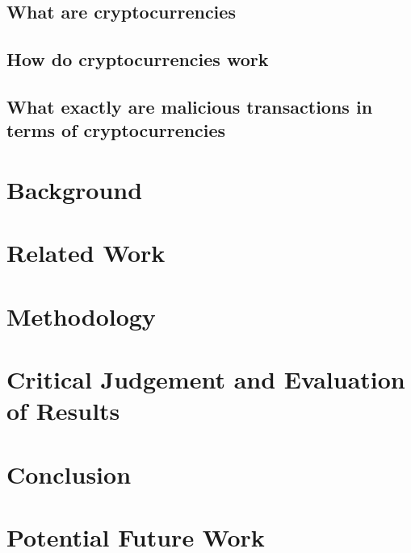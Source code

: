 \documentclass{article}
\begin{document}
\subsection{What are cryptocurrencies}
\subsection{How do cryptocurrencies work}
\subsection{What exactly are malicious transactions in terms of cryptocurrencies}
\pagebreak
\section{Background}
\pagebreak
\section{Related Work}
\pagebreak
\section{Methodology}
\pagebreak
\section{Critical Judgement and Evaluation of Results}
\pagebreak
\section{Conclusion}
\pagebreak
\section{Potential Future Work}
\pagebreak
\end{document}
